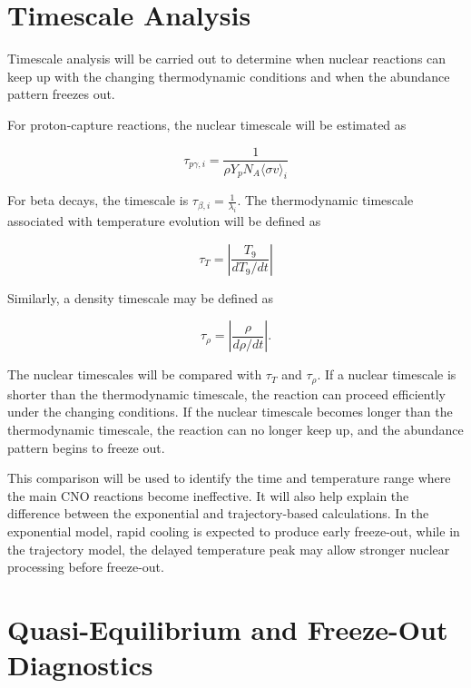 \section{Timescale Analysis}

Timescale analysis will be carried out to determine when nuclear reactions can keep up with the changing thermodynamic conditions and when the abundance pattern freezes out.

For proton-capture reactions, the nuclear timescale will be estimated as

\begin{equation}
    \tau_{p\gamma,i} = \frac{1}{\rho Y_p N_A \langle \sigma v \rangle_i}
\end{equation}

For beta decays, the timescale is $\tau_{\beta,i} = \frac{1}{\lambda_i}$. The thermodynamic timescale associated with temperature evolution will be defined as

\begin{equation}
    \tau_T =
\left|
\frac{T_9}{dT_9/dt}
\right|
\end{equation}


Similarly, a density timescale may be defined as

\begin{equation}
\tau_{\rho} =
\left|
\frac{\rho}{d\rho/dt}
\right|.
\end{equation}


The nuclear timescales will be compared with $\tau_T$ and $\tau_\rho$. If a nuclear timescale is shorter than the thermodynamic timescale, the reaction can proceed efficiently under the changing conditions. If the nuclear timescale becomes longer than the thermodynamic timescale, the reaction can no longer keep up, and the abundance pattern begins to freeze out.

This comparison will be used to identify the time and temperature range where the main CNO reactions become ineffective. It will also help explain the difference between the exponential and trajectory-based calculations. In the exponential model, rapid cooling is expected to produce early freeze-out, while in the trajectory model, the delayed temperature peak may allow stronger nuclear processing before freeze-out.

\section{Quasi-Equilibrium and Freeze-Out Diagnostics}

